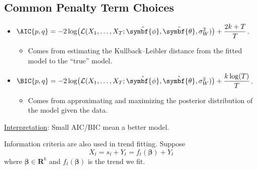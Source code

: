 \subsection*{Common Penalty Term Choices}
\begin{itemize}
    \item $ \AIC{p,q}=-2\log\bigl(\mathcal{L}(X_1,\ldots,X_T;\hat{\symbf{\phi}},\hat{\symbf{\theta}},\sigma_W^2)\bigr)+\dfrac{2k+T}{T} $.
          \begin{itemize}
              \item Comes from estimating the Kullback–Leibler distance from the fitted model to the ``true'' model.
          \end{itemize}
    \item $ \BIC{p,q}=-2\log\bigl(\mathcal{L}(X_1,\ldots,X_T;\hat{\symbf{\phi}},\hat{\symbf{\theta}},\sigma_W^2)\bigr)+\dfrac{k\log(T)}{T} $.
          \begin{itemize}
              \item Comes from approximating and maximizing the posterior distribution of the model given the data.
          \end{itemize}
\end{itemize}
\underline{Interpretation}: Small AIC/BIC mean a better model.

Information criteria are also used in trend fitting. Suppose
\[ X_t=s_t+Y_t=f_t(\symbf{\beta})+Y_t \]
where $ \symbf{\beta}\in\mathbf{R}^k $ and $ f_t(\symbf{\beta}) $ is the trend we fit.

